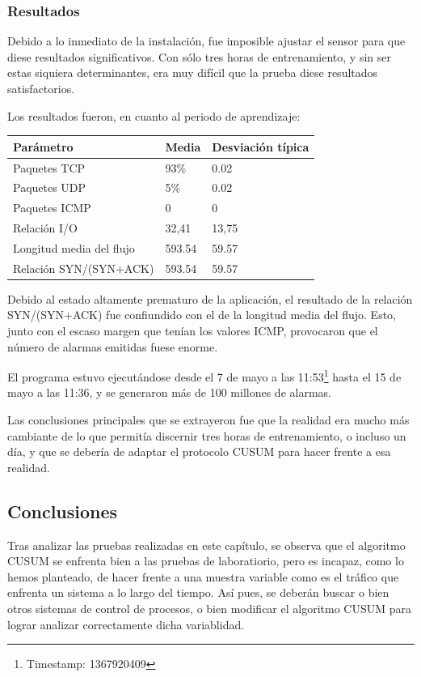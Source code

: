 \subsubsection{Resultados}
Debido a lo inmediato de la instalación, fue imposible ajustar el sensor para que diese resultados significativos. Con 
sólo tres horas de entrenamiento, y sin ser estas siquiera determinantes, era muy difícil que la prueba diese 
resultados satisfactorios.

Los resultados fueron, en cuanto al periodo de aprendizaje:
\begin{table}[htbp]
 \centering
 \begin {tabular}{lll}
  Parámetro & Media & Desviación típica  \\\hline
  Paquetes TCP & 93\% & 0.02 \\
  Paquetes UDP & 5\%  & 0.02 \\
  Paquetes ICMP & 0 & 0      \\
  Relación I/O & 32,41 & 13,75 \\
  Longitud media del flujo & 593.54 & 59.57 \\
  Relación SYN/(SYN+ACK) & 593.54 & 59.57   
 \end {tabular}
\end{table}

Debido al estado altamente prematuro de la aplicación, el resultado de la relación SYN/(SYN+ACK) fue confiundido con el 
de la longitud media del flujo. Esto, junto con el escaso margen que tenían los valores ICMP, provocaron que el número 
de alarmas emitidas fuese enorme.

El programa estuvo ejecutándose desde el 7 de mayo a las 11:53\footnote{Timestamp: 1367920409} hasta el 15 de mayo a 
las 11:36, y se generaron más de 100 millones de alarmas.

Las conclusiones principales que se extrayeron fue que la realidad era mucho más cambiante de lo que permitía discernir 
tres horas de entrenamiento, o incluso un día, y que se debería de adaptar el protocolo CUSUM para hacer frente a esa 
realidad.

\subsection{Conclusiones}
Tras analizar las pruebas realizadas en este capítulo, se observa que el algoritmo CUSUM se enfrenta bien a las pruebas 
de laboratiorio, pero es incapaz, como lo hemos planteado, de hacer frente a una muestra variable como es el tráfico 
que enfrenta un sistema a lo largo del tiempo. Así pues, se deberán buscar o bien otros sistemas de control de 
procesos, o bien modificar el algoritmo CUSUM para lograr analizar correctamente dicha variablidad.


\endinput
